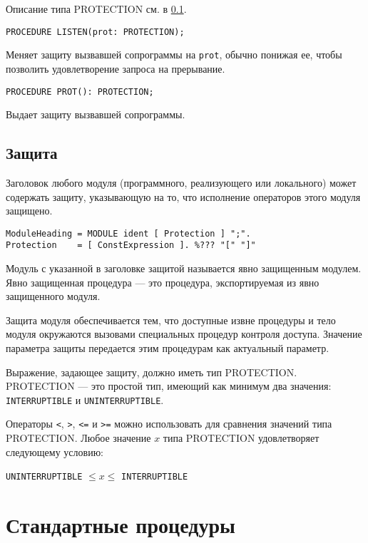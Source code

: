 Описание типа PROTECTION см. в \ref{m2:ISO:prot}.

\begin{verbatim}
PROCEDURE LISTEN(prot: PROTECTION);
\end{verbatim}

Меняет защиту вызвавшей сопрограммы на {\tt prot},
обычно понижая ее, чтобы позволить
удовлетворение запроса на прерывание.

\begin{verbatim}
PROCEDURE PROT(): PROTECTION;
\end{verbatim}
Выдает защиту вызвавшей сопрограммы.

\subsection{Защита}\label{m2:ISO:prot}

Заголовок любого модуля (программного, реализующего или локального)
может содержать защиту, %
указывающую на то, что исполнение операторов этого модуля защищено.

\begin{verbatim}
ModuleHeading = MODULE ident [ Protection ] ";".
Protection    = [ ConstExpression ]. %??? "[" "]"
\end{verbatim}

Модуль с указанной в заголовке защитой называется явно защищенным
модулем. Явно защищенная процедура --- это процедура,
экспортируемая из явно защищенного модуля.

Защита модуля обеспечивается тем, что доступные извне процедуры
и тело модуля окружаются вызовами специальных процедур контроля
доступа. Значение параметра защиты передается этим процедурам 
как актуальный параметр.

Выражение, задающее защиту, должно иметь тип PROTECTION. 
PROTECTION --- это простой тип, имеющий как минимум два значения:
{\tt INTERRUPTIBLE} и {\tt UNINTERRUPTIBLE}.

Операторы \verb+<+, \verb+>+, \verb+<=+ и \verb+>=+ можно 
использовать для сравнения значений типа 
PROTECTION.
Любое значение $x$ типа PROTECTION удовлетворяет следующему условию:
\begin{center}
        {\tt UNINTERRUPTIBLE} $\leq x\leq$ {\tt INTERRUPTIBLE}
\end{center}

\section{Стандартные процедуры}\label{m2:stdproc}

